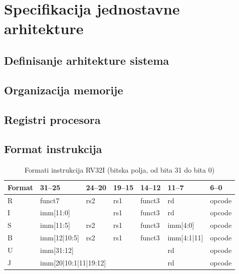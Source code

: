 \chapter{Specifikacija jednostavne arhitekture}
\label{ch:specifikacija}


\section{Definisanje arhitekture sistema}
\label{sec:definisanje-arhitekture}

\section{Organizacija memorije}
\label{sec:memorija}

\section{Registri procesora}
\label{sec:registri}

\section{Format instrukcija}
\label{sec:format-instrukcija}

\begin{table}[H]
  \centering
  \caption{Formati instrukcija RV32I (bitska polja, od bita 31 do bita 0)}
  \label{tab:formati}
  \small
  \begin{tabular}{@{}lllllll@{}}
    \toprule
    Format & 31--25 & 24--20 & 19--15 & 14--12 & 11--7 & 6--0 \\
    \midrule
    R & funct7 & rs2 & rs1 & funct3 & rd & opcode \\
    I & \multicolumn{2}{l}{imm[11:0]} & rs1 & funct3 & rd & opcode \\
    S & imm[11:5] & rs2 & rs1 & funct3 & imm[4:0] & opcode \\
    B & imm[12|10:5] & rs2 & rs1 & funct3 & imm[4:1|11] & opcode \\
    U & \multicolumn{4}{l}{imm[31:12]} & rd & opcode \\
    J & \multicolumn{4}{l}{imm[20|10:1|11|19:12]} & rd & opcode \\
    \bottomrule
  \end{tabular}
\end{table}

